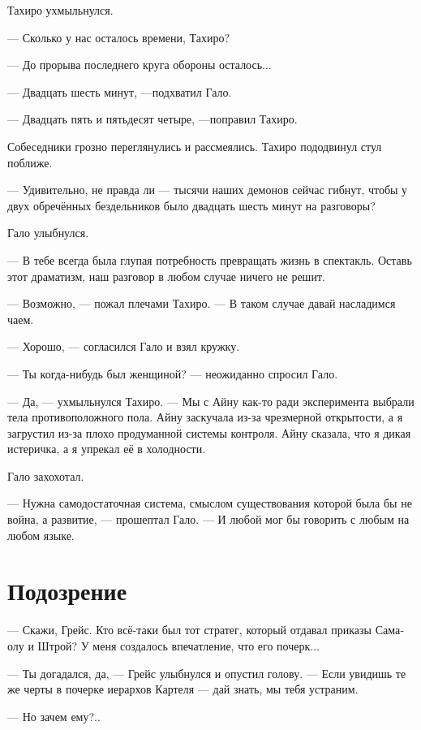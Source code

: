 \documentclass[a4paper,12pt,fleqn]{book}\usepackage{polyglossia}\setdefaultlanguage[babelshorthands=true]{russian}\setotherlanguage{english}\defaultfontfeatures{Ligatures=TeX,Mapping=tex-text}\usepackage{xcolor}\newcommand{\ml}[3]{#2}
\newcommand{\textspace}{\vspace{1em}{\centering\Large\bfseries<...>\par}\vspace{1em}}
\begin{document}
{Тахиро ухмыльнулся.

--- Сколько у нас осталось времени, Тахиро?

--- До прорыва последнего круга обороны осталось...

--- Двадцать шесть минут, ---подхватил Гало.

--- Двадцать пять и пятьдесят четыре, ---поправил Тахиро.

Собеседники грозно переглянулись и рассмеялись.
Тахиро пододвинул стул поближе.

--- Удивительно, не правда ли --- тысячи наших демонов сейчас гибнут, чтобы у двух обречённых бездельников было двадцать шесть минут на разговоры?

Гало улыбнулся.

--- В тебе всегда была глупая потребность превращать жизнь в спектакль.
Оставь этот драматизм, наш разговор в любом случае ничего не решит.

--- Возможно, --- пожал плечами Тахиро.
--- В таком случае давай насладимся чаем.

--- Хорошо, --- согласился Гало и взял кружку.

\textspace

--- Ты когда-нибудь был женщиной? --- неожиданно спросил Гало.

--- Да, --- ухмыльнулся Тахиро.
--- Мы с Айну как-то ради эксперимента выбрали тела противоположного пола.
Айну заскучала из-за чрезмерной открытости, а я загрустил из-за плохо продуманной системы контроля.
Айну сказала, что я дикая истеричка, а я упрекал её в холодности.

Гало захохотал.

\textspace

--- Нужна самодостаточная система, смыслом существования которой была бы не война, а развитие, --- прошептал Гало.
--- И любой мог бы говорить с любым на любом языке.

\section{Подозрение}

--- Скажи, Грейс.
Кто всё-таки был тот стратег, который отдавал приказы Самаолу и Штрой?
У меня создалось впечатление, что его почерк...

--- Ты догадался, да, --- Грейс улыбнулся и опустил голову.
--- Если увидишь те же черты в почерке иерархов Картеля --- дай знать, мы тебя устраним.

--- Но зачем ему?..

}
\end{document}
